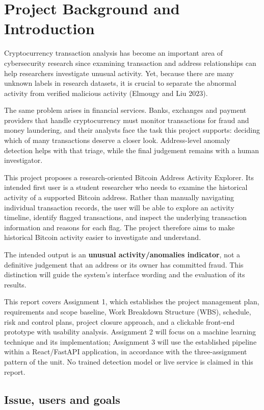 \section{Project Background and Introduction}
\label{sec:intro}

Cryptocurrency transaction analysis has become an important area of cybersecurity research since examining transaction and address relationships can help researchers investigate unusual activity. Yet, because there are many unknown labels in research datasets, it is crucial to separate the abnormal activity from verified malicious activity (Elmougy and Liu 2023).

The same problem arises in financial services. Banks, exchanges and payment providers that handle cryptocurrency must monitor transactions for fraud and money laundering, and their analysts face the task this project supports: deciding which of many transactions deserve a closer look. Address-level anomaly detection helps with that triage, while the final judgement remains with a human investigator.

This project proposes a research-oriented Bitcoin Address Activity Explorer. Its intended first user is a student researcher who needs to examine the historical activity of a supported Bitcoin address. Rather than manually navigating individual transaction records, the user will be able to explore an activity timeline, identify flagged transactions, and inspect the underlying transaction information and reasons for each flag. The project therefore aims to make historical Bitcoin activity easier to investigate and understand.

The intended output is an \textbf{unusual activity/anomalies indicator}, not a definitive judgement that an address or its owner has committed fraud. This distinction will guide the system's interface wording and the evaluation of its results.

This report covers Assignment 1, which establishes the project management plan, requirements and scope baseline, Work Breakdown Structure (WBS), schedule, risk and control plans, project closure approach, and a clickable front-end prototype with usability analysis. Assignment 2 will focus on a machine learning technique and its implementation; Assignment 3 will use the established pipeline within a React/FastAPI application, in accordance with the three-assignment pattern of the unit. No trained detection model or live service is claimed in this report.

\subsection{Issue, users and goals}
\label{sec:goals}

